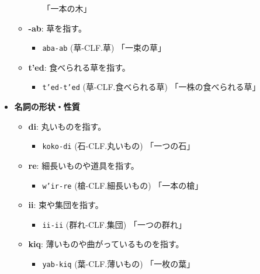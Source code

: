 \begin{itemize}
\begin{itemize}
\begin{itemize}
                    \quad 「一本の木」
                \end{itemize}
            \item \textbf{-ab}: 草を指す。
                \begin{itemize}
                    \item \texttt{aba-ab} (草-CLF.草) %
                    \quad 「一束の草」
                \end{itemize}
            \item \textbf{t'ed}: 食べられる草を指す。%
                \begin{itemize}
                    \item \texttt{t'ed-t'ed} (草-CLF.食べられる草) %
                    \quad 「一株の食べられる草」
                \end{itemize}
        \end{itemize}
    \item \textbf{名詞の形状・性質}
        \begin{itemize}
            \item \textbf{di}: 丸いものを指す。
                \begin{itemize}
                    \item \texttt{koko-di} (石-CLF.丸いもの) %
                    \quad 「一つの石」
                \end{itemize}
            \item \textbf{re}: 細長いものや道具を指す。
                \begin{itemize}
                    \item \texttt{w'ir-re} (槍-CLF.細長いもの) %
                    \quad 「一本の槍」
                \end{itemize}
            \item \textbf{ii}: 束や集団を指す。
                \begin{itemize}
                    \item \texttt{ii-ii} (群れ-CLF.集団) %
                    \quad 「一つの群れ」
                \end{itemize}
            \item \textbf{kiq}: 薄いものや曲がっているものを指す。
                \begin{itemize}
                    \item \texttt{yab-kiq} (葉-CLF.薄いもの) %
                    \quad 「一枚の葉」
                \end{itemize}

\end{itemize}
\end{itemize}
